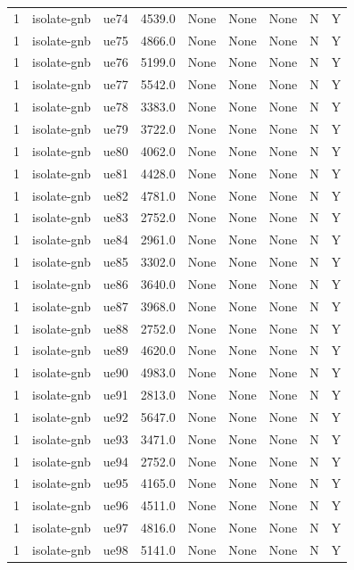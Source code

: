 \begin{table}[ht]
\begin{tabular}{|c|c|c|c|c|c|c|c|c|}
1 & isolate-gnb & ue74 & 4539.0 & None & None & None & N & Y \\
1 & isolate-gnb & ue75 & 4866.0 & None & None & None & N & Y \\
1 & isolate-gnb & ue76 & 5199.0 & None & None & None & N & Y \\
1 & isolate-gnb & ue77 & 5542.0 & None & None & None & N & Y \\
1 & isolate-gnb & ue78 & 3383.0 & None & None & None & N & Y \\
1 & isolate-gnb & ue79 & 3722.0 & None & None & None & N & Y \\
1 & isolate-gnb & ue80 & 4062.0 & None & None & None & N & Y \\
1 & isolate-gnb & ue81 & 4428.0 & None & None & None & N & Y \\
1 & isolate-gnb & ue82 & 4781.0 & None & None & None & N & Y \\
1 & isolate-gnb & ue83 & 2752.0 & None & None & None & N & Y \\
1 & isolate-gnb & ue84 & 2961.0 & None & None & None & N & Y \\
1 & isolate-gnb & ue85 & 3302.0 & None & None & None & N & Y \\
1 & isolate-gnb & ue86 & 3640.0 & None & None & None & N & Y \\
1 & isolate-gnb & ue87 & 3968.0 & None & None & None & N & Y \\
1 & isolate-gnb & ue88 & 2752.0 & None & None & None & N & Y \\
1 & isolate-gnb & ue89 & 4620.0 & None & None & None & N & Y \\
1 & isolate-gnb & ue90 & 4983.0 & None & None & None & N & Y \\
1 & isolate-gnb & ue91 & 2813.0 & None & None & None & N & Y \\
1 & isolate-gnb & ue92 & 5647.0 & None & None & None & N & Y \\
1 & isolate-gnb & ue93 & 3471.0 & None & None & None & N & Y \\
1 & isolate-gnb & ue94 & 2752.0 & None & None & None & N & Y \\
1 & isolate-gnb & ue95 & 4165.0 & None & None & None & N & Y \\
1 & isolate-gnb & ue96 & 4511.0 & None & None & None & N & Y \\
1 & isolate-gnb & ue97 & 4816.0 & None & None & None & N & Y \\
1 & isolate-gnb & ue98 & 5141.0 & None & None & None & N & Y \\

\end{tabular}
\end{table}
